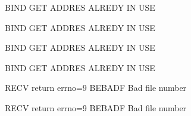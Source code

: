 
\begin{DoxyRefList}
\item[\label{bug__bug000004}%
\hypertarget{bug__bug000004}{}%
Global \hyperlink{sleave_8c_a8eb928d0ff6302e3c92af6dbf7da81b7}{open\+Connection} (int tcp\+Clnt\+Sock, struct sockaddr\+\_\+in $\ast$tcp\+Clnt\+Sock\+Addr, int tcp\+Clnt\+Sock\+Addr\+Len, int selected\+Server, srv $\ast$found\+Srvs)]B\+I\+ND G\+ET A\+D\+D\+R\+ES A\+L\+R\+E\+DY IN U\+SE 

B\+I\+ND G\+ET A\+D\+D\+R\+ES A\+L\+R\+E\+DY IN U\+SE  
\item[\label{bug__bug000001}%
\hypertarget{bug__bug000001}{}%
Global \hyperlink{master_8c_a4a81382cb810c6a27885a2e72846296a}{open\+Tcp\+Srv} (const int tcp\+Srv\+Sock, struct sockaddr\+\_\+in $\ast$tcp\+Srv\+Sock\+Addr, const int tcp\+Srv\+Sock\+Addr\+Len, struct sockaddr\+\_\+in $\ast$tcp\+Clnt\+Sock\+Addr, int tcp\+Clnt\+Sock\+Addr\+Len, int $\ast$connection\+Sock)]B\+I\+ND G\+ET A\+D\+D\+R\+ES A\+L\+R\+E\+DY IN U\+SE 

B\+I\+ND G\+ET A\+D\+D\+R\+ES A\+L\+R\+E\+DY IN U\+SE  
\item[\label{bug__bug000003}%
\hypertarget{bug__bug000003}{}%
Global \hyperlink{sleave_8c_ab76401dd1285091b95c991839fee8d97}{srvs\+In\+Net} (const int udp\+Clnt\+Sock, srv $\ast$srvs)]R\+E\+CV return errno=9 B\+E\+B\+A\+DF Bad file number 

R\+E\+CV return errno=9 B\+E\+B\+A\+DF Bad file number 
\end{DoxyRefList}